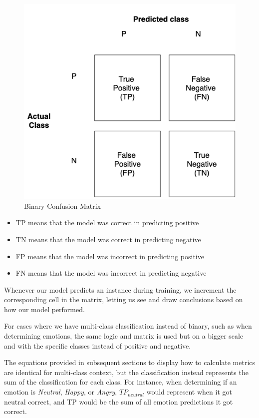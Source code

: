 \documentclass[nofilelist]{cslthse-msc}
\begin{document}
\begin{figure}[h!]
    \centering
    \hbox{\hspace{6em}\includegraphics[width=\textwidth/2]{msccls/explanatory_images/confusion_matrix.png}}
    \caption{Binary Confusion Matrix}
    \label{fig:confusion}
\end{figure}

\begin{itemize}
    \item TP means that the model was correct in predicting positive
    \item TN means that the model was correct in predicting negative
    \item FP means that the model was incorrect in predicting positive
    \item FN means that the model was incorrect in predicting negative
\end{itemize}

Whenever our model predicts an instance during training, we increment the corresponding cell in the matrix, letting us see and draw conclusions based on how our model performed. 


For cases where we have multi-class classification instead of binary, such as when determining emotions, the same logic and matrix is used but on a bigger scale and with the specific classes instead of positive and negative. 

The equations provided in subsequent sections to display how to calculate metrics are identical for multi-class context, but the classification instead represents the sum of the classification for each class. For instance, when determining if an emotion is \textit{Neutral}, \textit{Happy}, or \textit{Angry}, $TP_{neutral}$ would represent when it got neutral correct, and TP would be the sum of all emotion predictions it got correct.  
\end{document}
